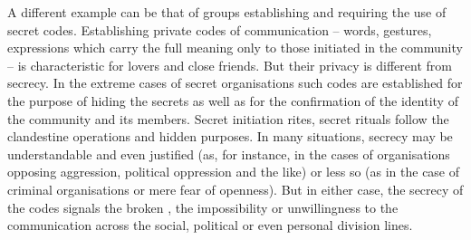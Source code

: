 \pa A different example can be that of groups establishing and requiring the use
of secret codes.  Establishing {private codes} of communication -- words,
gestures, expressions which carry the full meaning only to those initiated in
the {community} -- is characteristic for lovers and close friends. But
their privacy is different from secrecy.  In the extreme cases of secret
organisations such {codes} are established for the purpose of hiding the
secrets as well as for the confirmation of the identity of the community and its
members. Secret initiation rites, secret rituals follow the clandestine
operations and hidden purposes. In many situations, secrecy may be
understandable and even justified (as, for instance, in the cases of
organisations opposing aggression, political oppression and the like) or less so
(as in the case of criminal organisations or mere fear of openness). But in
either case, the secrecy of the codes signals the broken , the
impossibility or unwillingness to  the communication across the
social, political or even personal division lines.

